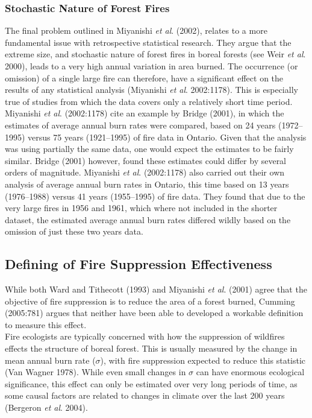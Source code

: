 \begin{spacing}{1.5}
\clearpage

\subsubsection{Stochastic Nature of Forest Fires}

The final problem outlined in Miyanishi \emph{et al}. (2002), relates to a more fundamental issue with retrospective statistical research. They argue that the extreme size, and stochastic nature of forest fires in boreal forests (see Weir \emph{et al}. 2000), leads to a very high annual variation in area burned. The occurrence (or omission) of a single large fire can therefore, have a significant effect on the results of any statistical analysis (Miyanishi \emph{et al}. 2002:1178). This is especially true of studies from which the data covers only a relatively short time period. Miyanishi \emph{et al}. (2002:1178) cite an example by Bridge (2001), in which the estimates of average annual burn rates were compared, based on 24 years (1972--1995) versus 75 years (1921--1995) of fire data in Ontario. Given that the analysis was using partially the same data, one would expect the estimates to be fairly similar. Bridge (2001) however, found these estimates could differ by several orders of magnitude. Miyanishi \emph{et al}. (2002:1178) also carried out their own analysis of average annual burn rates in Ontario, this time based on 13 years (1976--1988) versus 41 years (1955--1995) of fire data. They found that due to the very large fires in 1956 and 1961, which where not included in the shorter dataset, the estimated average annual burn rates differed wildly based on the omission of just these two years data.

\subsection{Defining of Fire Suppression Effectiveness}

While both Ward and Tithecott (1993) and Miyanishi \emph{et al}. (2001) agree that the objective of fire suppression is to reduce the area of a forest burned,  Cumming (2005:781) argues that neither have been able to developed a workable definition to measure this effect. \\

\noindent Fire ecologists are typically concerned with how the suppression of wildfires effects the structure of boreal forest. This is usually measured by the change in mean annual burn rate ($\sigma$), with fire suppression expected to reduce this statistic (Van Wagner 1978). While even small changes in $\sigma$ can have enormous ecological significance, this effect can only be estimated over very long periods of time, as some causal factors are related to changes in climate over the last 200 years (Bergeron \emph{et al}. 2004).


\end{spacing}
